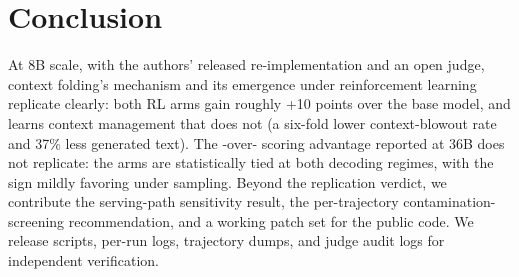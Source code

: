 \section{Conclusion}
\label{sec:conclusion}

At 8B scale, with the authors' released re-implementation and an open judge, context folding's
mechanism and its emergence under reinforcement learning replicate clearly: both RL arms gain
roughly +10 points over the base model, and \foldgrpo{} learns context management that \grpo{}
does not (a six-fold lower context-blowout rate and 37\% less generated text). The
\foldgrpo{}-over-\grpo{} scoring advantage reported at 36B does not replicate: the arms are
statistically tied at both decoding regimes, with the sign mildly favoring \foldgrpo{} under
sampling. Beyond the replication verdict, we contribute the serving-path sensitivity result,
the per-trajectory contamination-screening recommendation, and a working patch set for the
public code. We release scripts, per-run logs, trajectory dumps, and judge audit logs for
independent verification.
